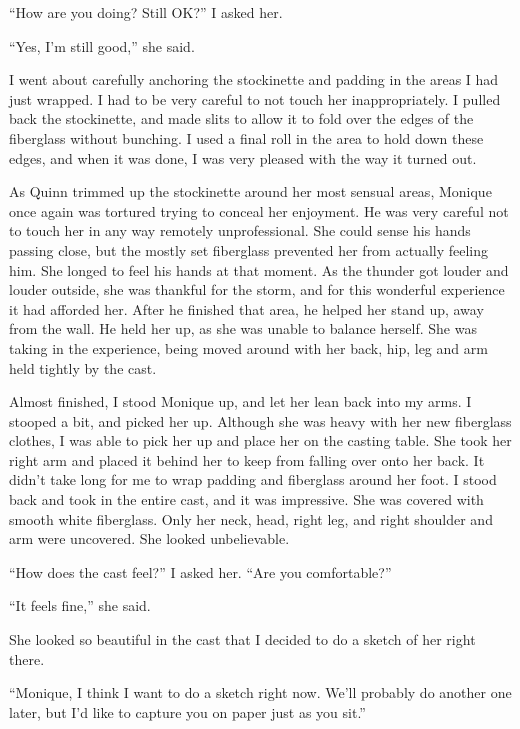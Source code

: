 ``How are you doing? Still OK?'' I asked her.

``Yes, I'm still good,'' she said.

I went about carefully anchoring the stockinette and padding in the areas I had just
wrapped. I had to be very careful to not touch her inappropriately. I pulled back the
stockinette, and made slits to allow it to fold over the edges of the fiberglass without
bunching. I used a final roll in the area to hold down these edges, and when it was done, I was
very pleased with the way it turned out.

\begin{thought}
As Quinn trimmed up the stockinette around her most sensual areas, Monique once again was
tortured trying to conceal her enjoyment. He was very careful not to touch her in any way
remotely unprofessional. She could sense his hands passing close, but the mostly set fiberglass
prevented her from actually feeling him. She longed to feel his hands at that moment. As the
thunder got louder and louder outside, she was thankful for the storm, and for this wonderful
experience it had afforded her. After he finished that area, he helped her stand up, away from
the wall. He held her up, as she was unable to balance herself. She was taking in the
experience, being moved around with her back, hip, leg and arm held tightly by the cast.
\end{thought}

Almost finished, I stood Monique up, and let her lean back into my arms. I stooped a bit,
and picked her up. Although she was heavy with her new fiberglass clothes, I was able to pick
her up and place her on the casting table. She took her right arm and placed it behind her to
keep from falling over onto her back. It didn't take long for me to wrap padding and fiberglass
around her foot. I stood back and took in the entire cast, and it was impressive. She was
covered with smooth white fiberglass. Only her neck, head, right leg, and right shoulder and arm
were uncovered. She looked unbelievable.

``How does the cast feel?'' I asked her. ``Are you comfortable?''

``It feels fine,'' she said. 

She looked so beautiful in the cast that I decided to do a sketch of her right there.

``Monique, I think I want to do a sketch right now. We'll probably do another one later,
but I'd like to capture you on paper just as you sit.''

